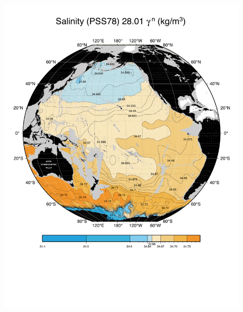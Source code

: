 \documentclass{beamer}
\begin{document}
\begin{frame}[plain,t]
    \begin{columns}
      \begin{column}{0.33\textwidth}
        \includegraphics[width=\textwidth]{salnty_isopyc_final_pdf/pac2801_salnty_final_color.pdf}  
       \end{column}
      \begin{column}{0.33\textwidth}

\end{column}
\end{columns}
\end{frame}
\end{document}
